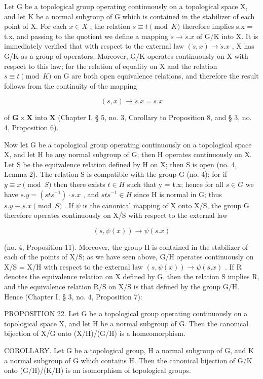 Let G be a topological group operating continuously on a topological space X, and let K be a normal subgroup of G which is contained in the stabilizer of each point of X. For each \(x \in X\) , the relation \(s \equiv t \pmod{K}\) therefore implies s.x = t.x, and passing to the quotient we define a mapping \(\dot{s} \to \dot{s}.x\) of G/K into X. It is immediately verified that with respect to the external law \((\dot{s}, x) \to \dot{s}.x\) , X has G/K as a group of operators. Moreover, G/K operates continuously on X with respect to this law; for the relation of equality on X and the relation \(s \equiv t \pmod{K}\) on G are both open equivalence relations, and therefore the result follows from the continuity of the mapping

\[
(s, x) \rightarrow \dot {s}. x = s. x
\]

of \(\mathbf{G} \times \mathbf{X}\) into \(\mathbf{X}\) (Chapter I, § 5, no. 3, Corollary to Proposition 8, and § 3, no. 4, Proposition 6).

Now let G be a topological group operating continuously on a topological space X, and let H be any normal subgroup of G; then H operates continuously on X. Let S be the equivalence relation defined by H on X; then S is open (no. 4, Lemma 2). The relation S is compatible with the group G (no. 4); for if \(y \equiv x \pmod{S}\) then there exists \(t \in H\) such that y = t.x; hence for all \(s \in G\) we have \(s.y = (sts^{-1}) \cdot s.x\) , and \(sts^{-1} \in H\) since H is normal in G; thus \(s.y \equiv s.x \pmod{S}\) . If \(\psi\) is the canonical mapping of X onto X/S, the group G therefore operates continuously on X/S with respect to the external law

\[
(s, \psi (x)) \rightarrow \psi (s. x)
\]

(no. 4, Proposition 11). Moreover, the group H is contained in the stabilizer of each of the points of X/S; as we have seen above, G/H operates continuously on X/S = X/H with respect to the external law \((s, \psi(x)) \to \psi(s.x)\) . If R denotes the equivalence relation on X defined by G, then the relation S implies R, and the equivalence relation R/S on X/S is that defined by the group G/H. Hence (Chapter I, § 3, no. 4, Proposition 7):

PROPOSITION 22. Let G be a topological group operating continuously on a topological space X, and let H be a normal subgroup of G. Then the canonical bijection of X/G onto (X/H)/(G/H) is a homeomorphism.

COROLLARY. Let G be a topological group, H a normal subgroup of G, and K a normal subgroup of G which contains H. Then the canonical bijection of G/K onto (G/H)/(K/H) is an isomorphism of topological groups.


